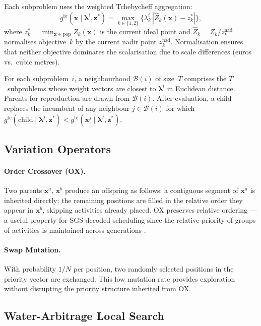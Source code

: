 \documentclass[12pt,a4paper]{article}
\newcommand{\bx}{\mathbf{x}}
\newcommand{\blam}{\boldsymbol{\lambda}}
\newcommand{\zstar}{\mathbf{z}^*}
\begin{document}
Each subproblem uses the weighted Tchebycheff aggregation:
\begin{equation}
  g^{\mathrm{te}}(\bx \mid \blam^i, \zstar) =
  \max_{k \in \{1,2\}} \bigl\{ \lambda_k^i \,
  |\hat{Z}_k(\bx) - z_k^*| \bigr\},
  \label{eq:tcheby}
\end{equation}
where $z_k^* = \min_{\bx \in \text{pop}} Z_k(\bx)$ is the current ideal point and
$\hat{Z}_k = Z_k / z_k^{\mathrm{nad}}$ normalises objective~$k$ by the current
nadir point $z_k^{\mathrm{nad}}$. Normalisation ensures that neither objective
dominates the scalarisation due to scale differences (euros vs.\ cubic metres).

For each subproblem~$i$, a neighbourhood $\mathcal{B}(i)$ of size~$T$ comprises
the $T$~subproblems whose weight vectors are closest to $\blam^i$ in Euclidean
distance.  Parents for reproduction are drawn from $\mathcal{B}(i)$.  After
evaluation, a child replaces the incumbent of any neighbour $j \in \mathcal{B}(i)$
for which $g^{\mathrm{te}}(\text{child} \mid \blam^j, \zstar) <
g^{\mathrm{te}}(\bx^j \mid \blam^j, \zstar)$.

\subsection{Variation Operators}
\label{sec:algo:ops}

\paragraph{Order Crossover (OX).}  Two parents $\bx^a$, $\bx^b$ produce an
offspring as follows: a contiguous segment of $\bx^a$ is inherited directly; the
remaining positions are filled in the relative order they appear in $\bx^b$,
skipping activities already placed.  OX preserves relative ordering — a useful
property for SGS-decoded scheduling since the relative priority of groups of
activities is maintained across generations \citep{Davis1985}.

\paragraph{Swap Mutation.}  With probability $1/N$ per position, two randomly
selected positions in the priority vector are exchanged.  This low mutation rate
provides exploration without disrupting the priority structure inherited from OX.

\subsection{Water-Arbitrage Local Search}
\label{sec:algo:wa}
\end{document}
